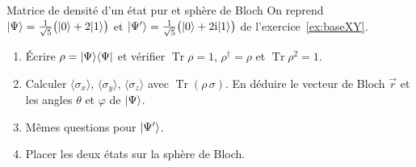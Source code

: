 \begin{exercice}{Matrice de densité d'un état pur et sphère de Bloch}\label{ex:blochpur}
On reprend $|\Psi\rangle=\frac{1}{\sqrt5}\big(|0\rangle+2|1\rangle\big)$ et
$|\Psi'\rangle=\frac{1}{\sqrt5}\big(|0\rangle+2\mathrm{i}|1\rangle\big)$ de l'exercice~\ref{ex:baseXY}.
\begin{enumerate}[label=\arabic*.,nosep]
  \item Écrire $\rho=|\Psi\rangle\langle \Psi|$ et vérifier $\operatorname{Tr}\rho=1$, $\rho^\dagger=\rho$ et
        $\operatorname{Tr}\rho^2=1$.
  \item Calculer $\langle\sigma_x\rangle$, $\langle\sigma_y\rangle$, $\langle\sigma_z\rangle$ avec
        $\operatorname{Tr}(\rho\,\sigma)$. En déduire le vecteur de Bloch $\vec r$ et les angles $\theta$
        et $\varphi$ de $|\Psi\rangle$.
  \item Mêmes questions pour $|\Psi'\rangle$.
  \item Placer les deux états sur la sphère de Bloch.
\end{enumerate}
\end{exercice}
